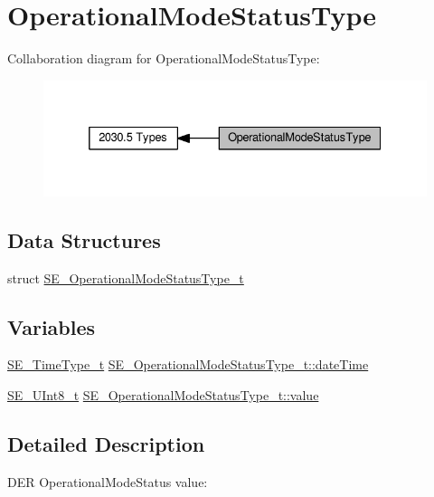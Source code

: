\hypertarget{group__OperationalModeStatusType}{}\section{Operational\+Mode\+Status\+Type}
\label{group__OperationalModeStatusType}
Collaboration diagram for Operational\+Mode\+Status\+Type\+:\nopagebreak
\begin{figure}[H]
\begin{center}
\leavevmode
\includegraphics[width=332pt]{group__OperationalModeStatusType}
\end{center}
\end{figure}
\subsection*{Data Structures}
\begin{DoxyCompactItemize}
\item 
struct \hyperlink{structSE__OperationalModeStatusType__t}{S\+E\+\_\+\+Operational\+Mode\+Status\+Type\+\_\+t}
\end{DoxyCompactItemize}
\subsection*{Variables}
\begin{DoxyCompactItemize}
\item 
\hyperlink{group__TimeType_ga6fba87a5b57829b4ff3f0e7638156682}{S\+E\+\_\+\+Time\+Type\+\_\+t} \hyperlink{group__OperationalModeStatusType_gab1ca6819ce73c80e1f1a370d20ff5247}{S\+E\+\_\+\+Operational\+Mode\+Status\+Type\+\_\+t\+::date\+Time}
\item 
\hyperlink{group__UInt8_gaf7c365a1acfe204e3a67c16ed44572f5}{S\+E\+\_\+\+U\+Int8\+\_\+t} \hyperlink{group__OperationalModeStatusType_gade4c320e2f3a121c6918c2446220e81a}{S\+E\+\_\+\+Operational\+Mode\+Status\+Type\+\_\+t\+::value}
\end{DoxyCompactItemize}


\subsection{Detailed Description}
D\+ER Operational\+Mode\+Status value\+:

